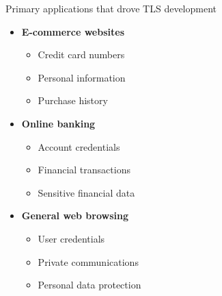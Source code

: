 \documentclass[aspectratio=169, lualatex, handout]{beamer}
\begin{document}
\begin{frame}{Primary applications that drove TLS development}
	\begin{itemize}[<+->]
		\item \textbf{E-commerce websites}
		      \begin{itemize}
			      \item Credit card numbers
			      \item Personal information
			      \item Purchase history
		      \end{itemize}
		\item \textbf{Online banking}
		      \begin{itemize}
			      \item Account credentials
			      \item Financial transactions
			      \item Sensitive financial data
		      \end{itemize}
		\item \textbf{General web browsing}
		      \begin{itemize}
			      \item User credentials
			      \item Private communications
			      \item Personal data protection
		      \end{itemize}
	\end{itemize}
\end{frame}
\end{document}
